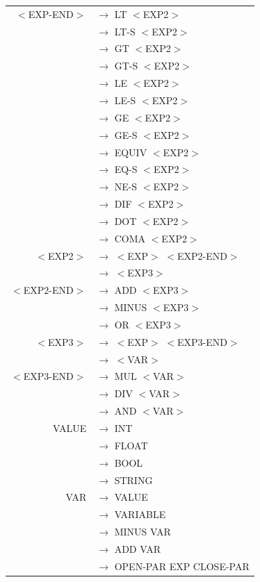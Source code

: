 \documentclass[a4paper,10pt]{article}
\begin{document}
\begin{tabular}{rl}
					
$<$EXP-END$>$		& $\rightarrow$ LT $<$EXP2$>$\\
					& $\rightarrow$ LT-S $<$EXP2$>$\\
					& $\rightarrow$ GT $<$EXP2$>$\\
					& $\rightarrow$ GT-S $<$EXP2$>$\\
					& $\rightarrow$ LE $<$EXP2$>$\\
					& $\rightarrow$ LE-S $<$EXP2$>$\\
					& $\rightarrow$ GE $<$EXP2$>$\\
					& $\rightarrow$ GE-S $<$EXP2$>$\\
					& $\rightarrow$ EQUIV $<$EXP2$>$\\
					& $\rightarrow$ EQ-S $<$EXP2$>$\\
					& $\rightarrow$ NE-S $<$EXP2$>$\\
					& $\rightarrow$ DIF $<$EXP2$>$\\
					& $\rightarrow$ DOT $<$EXP2$>$\\
					& $\rightarrow$ COMA $<$EXP2$>$\\
										
					
$<$EXP2$>$			& $\rightarrow$ $<$EXP$>$ $<$EXP2-END$>$\\
					& $\rightarrow$ $<$EXP3$>$\\
					
$<$EXP2-END$>$		& $\rightarrow$  ADD $<$EXP3$>$\\
					& $\rightarrow$  MINUS $<$EXP3$>$\\
					& $\rightarrow$  OR $<$EXP3$>$\\					

					
$<$EXP3$>$			& $\rightarrow$ $<$EXP$>$ $<$EXP3-END$>$\\
					& $\rightarrow$ $<$VAR$>$\\
					
$<$EXP3-END$>$		& $\rightarrow$ MUL $<$VAR$>$\\
					& $\rightarrow$ DIV $<$VAR$>$\\
					& $\rightarrow$ AND $<$VAR$>$\\

VALUE				& $\rightarrow$ INT \\
					& $\rightarrow$ FLOAT \\
					& $\rightarrow$ BOOL \\
					& $\rightarrow$ STRING \\
					
VAR					& $\rightarrow$ VALUE \\
					& $\rightarrow$ VARIABLE \\
					& $\rightarrow$ MINUS VAR\\
					& $\rightarrow$ ADD VAR \\
					& $\rightarrow$ OPEN-PAR EXP CLOSE-PAR \\

\end{tabular}
\end{document}
